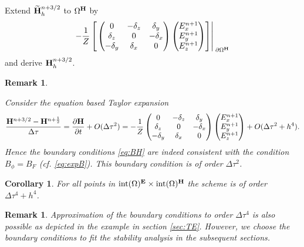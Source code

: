 \documentclass[12pt,reqno]{amsart}
\newcommand{\e}{{\bf E}}
\newcommand{\h}{{\bf H}}
\newtheorem{cor}[theorem]{Corollary}
\newtheorem{rem}[theorem]{Remark}
\theoremstyle{definition}
\numberwithin{equation}{section}
\newcommand{\intr}[1]{\mathrm{int}(#1)}
\def\Gw{\Omega}     \def\Gx{\Xi}         \def\Gy{\Psi}
\begin{document}
		Extend $\widetilde{\h}_h^{n+3/2}$
	to $\Gw^\h$ by
	$$
		-\frac{1}{Z}
	\left[ \left.	
	\begin{pmatrix}
		0& -\delta_z & \delta _y\\
		\delta_z&0&-\delta_x\\
		-\delta_y&\delta_x&0\\
	\end{pmatrix}
	\begin{pmatrix}
		E_x^{n+1}\\
		E_y^{n+1}\\
		E_z^{n+1}
	\end{pmatrix}\right]\right|_{\; \partial{\Gw^{\h}}}^{\;}
	$$
	and derive $\h_h^{n+3/2}$.
	
\begin{rem}\label{rem:expB}


Consider the equation based  Taylor expansion
	$$
	\frac{\h^{n+3/2}-\h^{n+\frac{1}{2} } }{\Delta \tau}=
	\frac{\partial \h}{\partial t}+O(\Delta \tau ^2)=
	-\frac{1}{Z}	\begin{pmatrix}
		0& -\delta_z & \delta _y\\
		\delta_z&0&-\delta_x\\
		-\delta_y&\delta_x&0\\
	\end{pmatrix}
	\begin{pmatrix}
		E_x^{n+1}\\
		E_y^{n+1}\\
		E_z^{n+1}
	\end{pmatrix}+O(\Delta \tau^2+h^4).
	$$
	Hence the  boundary conditions \eqref{eq:BH} are 
 indeed consistent with the condition 
	$B_\phi=B_F$ (cf. \eqref{eq:expB}).
 This boundary condition is of order $\Delta \tau^2$.
\end{rem}
	\begin{cor}
		For all points in $\intr \Gw^{\e}\times\intr\Gw^\h$ the scheme is of order $\Delta \tau^4+h^4$.
	\end{cor}
   
	\begin{rem}
	Approximation of the boundary conditions to order $\Delta \tau ^4$ is also possible as depicted in the example in section \ref{sec:TE}. However, we choose the boundary conditions to fit the stability analysis in the subsequent sections.
	\end{rem}
\end{document}
